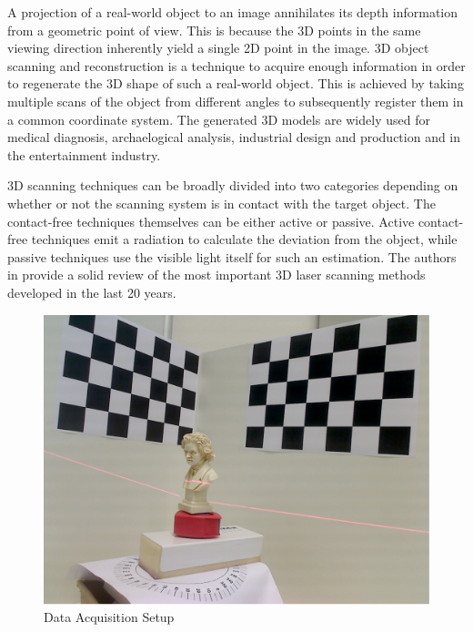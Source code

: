 A projection of a real-world object to an image annihilates its depth
information from a geometric point of view. This is because the 3D points in
the same viewing direction inherently yield a single 2D point in the image. 3D
object scanning and reconstruction is a technique to acquire enough
information in order to regenerate the 3D shape of such a real-world object.
This is achieved by taking multiple scans of the object from different angles
to subsequently register them in a common coordinate system. The generated 3D
models are widely used for medical diagnosis, archaelogical analysis,
industrial design and production and in the entertainment industry.

3D scanning techniques can be broadly divided into two categories depending on
whether or not the scanning system is in contact with the target object.  The
contact-free techniques themselves can be either active or passive. Active
contact-free techniques emit a radiation to calculate the deviation from the
object, while passive techniques use the visible light itself for such an
estimation. The authors in \cite{blaisf:2004} provide a solid review of the
most important 3D laser scanning methods developed in the last 20 years.

\begin{figure}[ht!]
\centering
\includegraphics[width=1.00\linewidth]{figures/introduction}
\caption{Data Acquisition Setup}
\label{figure:acquisition}
\end{figure}

